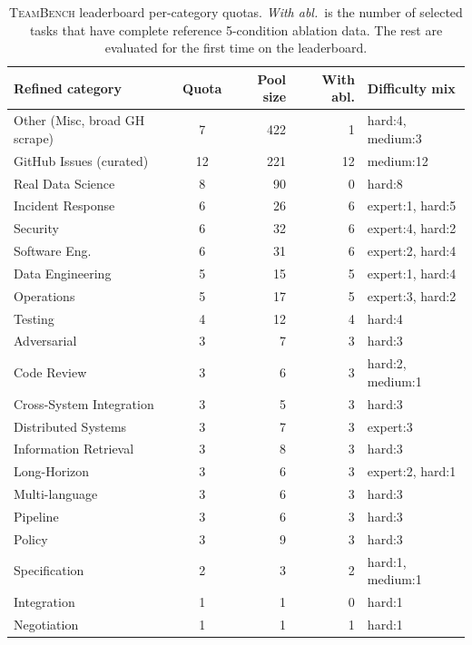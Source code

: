 \documentclass{article}
\begin{document}
\begin{table}[h]
\centering
\caption{\textsc{TeamBench} leaderboard per-category quotas. \textit{With abl.}\ is the number of selected tasks that have complete reference 5-condition ablation data. The rest are evaluated for the first time on the leaderboard.}
\label{tab:lb90-detail}
\small
\setlength{\tabcolsep}{6pt}
\begin{tabular}{lcrrl}
\toprule
Refined category & Quota & Pool size & With abl. & Difficulty mix \\
\midrule
Other (Misc, broad GH scrape) & 7  & 422 & 1  & hard:4, medium:3 \\
GitHub Issues (curated)       & 12 & 221 & 12 & medium:12 \\
Real Data Science             & 8  & 90  & 0  & hard:8 \\
Incident Response             & 6  & 26  & 6  & expert:1, hard:5 \\
Security                      & 6  & 32  & 6  & expert:4, hard:2 \\
Software Eng.                 & 6  & 31  & 6  & expert:2, hard:4 \\
Data Engineering              & 5  & 15  & 5  & expert:1, hard:4 \\
Operations                    & 5  & 17  & 5  & expert:3, hard:2 \\
Testing                       & 4  & 12  & 4  & hard:4 \\
Adversarial                   & 3  & 7   & 3  & hard:3 \\
Code Review                   & 3  & 6   & 3  & hard:2, medium:1 \\
Cross-System Integration      & 3  & 5   & 3  & hard:3 \\
Distributed Systems           & 3  & 7   & 3  & expert:3 \\
Information Retrieval         & 3  & 8   & 3  & hard:3 \\
Long-Horizon                  & 3  & 6   & 3  & expert:2, hard:1 \\
Multi-language                & 3  & 6   & 3  & hard:3 \\
Pipeline                      & 3  & 6   & 3  & hard:3 \\
Policy                        & 3  & 9   & 3  & hard:3 \\
Specification                 & 2  & 3   & 2  & hard:1, medium:1 \\
Integration                   & 1  & 1   & 0  & hard:1 \\
Negotiation                   & 1  & 1   & 1  & hard:1 \\
\bottomrule
\end{tabular}
\end{table}
\end{document}
